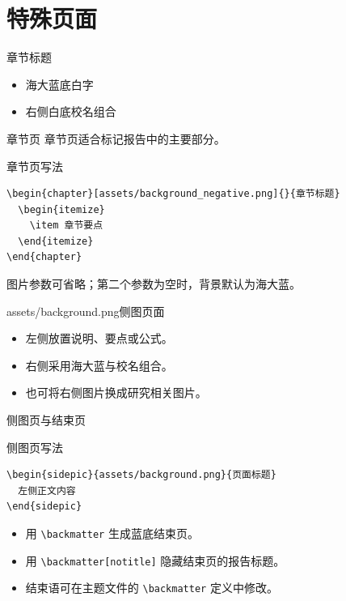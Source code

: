 \documentclass{beamer}
\begin{document}
\section{特殊页面}

\begin{chapter}{}{章节标题}
\begin{itemize}
  \item 海大蓝底白字
  \item 右侧白底校名组合
\end{itemize}
\end{chapter}

\begin{frame}[fragile]{章节页}
章节页适合标记报告中的主要部分。
\begin{block}{章节页写法}
\begin{verbatim}
\begin{chapter}[assets/background_negative.png]{}{章节标题}
  \begin{itemize}
    \item 章节要点
  \end{itemize}
\end{chapter}
\end{verbatim}
\end{block}
图片参数可省略；第二个参数为空时，背景默认为海大蓝。
\end{frame}

\begin{sidepic}{assets/background.png}{侧图页面}
\begin{itemize}
  \item 左侧放置说明、要点或公式。
  \item 右侧采用海大蓝与校名组合。
  \item 也可将右侧图片换成研究相关图片。
\end{itemize}
\end{sidepic}

\begin{frame}[fragile]{侧图页与结束页}
\begin{block}{侧图页写法}
\begin{verbatim}
\begin{sidepic}{assets/background.png}{页面标题}
  左侧正文内容
\end{sidepic}
\end{verbatim}
\end{block}
\begin{itemize}
  \item 用 \verb|\backmatter| 生成蓝底结束页。
  \item 用 \verb|\backmatter[notitle]| 隐藏结束页的报告标题。
  \item 结束语可在主题文件的 \verb|\backmatter| 定义中修改。
\end{itemize}
\end{frame}
\end{document}
